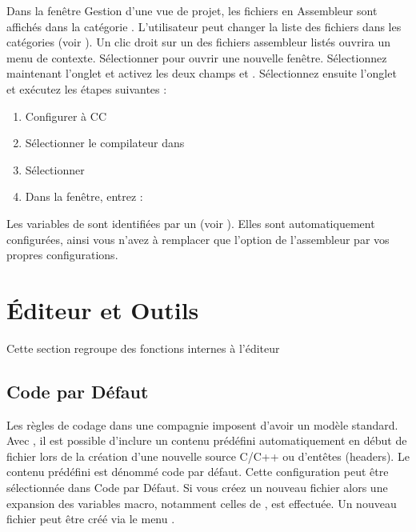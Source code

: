 Dans la fenêtre Gestion d'une vue de projet, les fichiers en Assembleur sont affichés dans la catégorie . L'utilisateur peut changer la liste des fichiers dans les catégories (voir ). Un clic droit sur un des fichiers assembleur listés ouvrira un menu de contexte. Sélectionner  pour ouvrir une nouvelle fenêtre. Sélectionnez maintenant l'onglet  et activez les deux champs   et . Sélectionnez ensuite l'onglet  et exécutez les étapes suivantes :

\begin{enumerate}
\item Configurer  à CC
\item Sélectionner le compilateur dans 
\item Sélectionner 
\item Dans la fenêtre, entrez :
\end{enumerate}

Les variables de \codeblocks sont identifiées par un \codeline{$} (voir ). Elles sont automatiquement configurées, ainsi vous n'avez à remplacer que l'option de l'assembleur  par vos propres configurations.


\section{Éditeur et Outils}
\begin{samepage}
Cette section regroupe des fonctions internes à l'éditeur

\subsection{Code par Défaut}
\end{samepage}

Les règles de codage dans une compagnie imposent d'avoir un modèle standard. Avec \codeblocks, il est possible d'inclure un contenu prédéfini automatiquement en début de fichier lors de la création d'une nouvelle source C/C++ ou d'entêtes (headers). Le contenu prédéfini est dénommé code par défaut. Cette configuration peut être sélectionnée dans   Code par Défaut. Si vous créez un nouveau fichier alors une expansion des variables macro, notamment celles de , est effectuée. Un nouveau fichier peut être créé via le menu .

